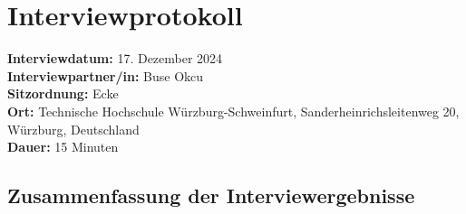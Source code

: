 \documentclass[a4paper,12pt]{article}
\begin{document}
\section*{Interviewprotokoll}

\textbf{Interviewdatum:} 17. Dezember 2024 \\
\textbf{Interviewpartner/in:} Buse Okcu \\
\textbf{Sitzordnung:} Ecke \\
\textbf{Ort:} Technische Hochschule Würzburg-Schweinfurt, Sanderheinrichsleitenweg 20, Würzburg, Deutschland  \\
\textbf{Dauer:} 15 Minuten

\subsection*{Zusammenfassung der Interviewergebnisse}
\end{document}

